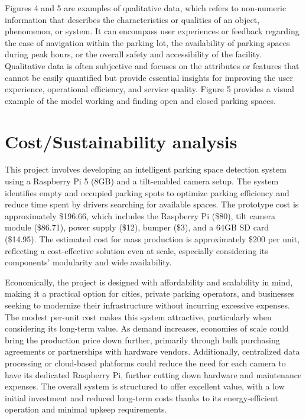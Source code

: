 \documentclass[conference]{IEEEtran}
\begin{document}
Figures 4 and 5 are examples of qualitative data, 
which refers to non-numeric information that describes the characteristics or qualities of an object, 
phenomenon, 
or system. 
It can encompass user experiences or feedback regarding the ease of navigation within the parking lot, 
the availability of parking spaces during peak hours, 
or the overall safety and accessibility of the facility. 
Qualitative data is often subjective and focuses on the attributes or features that cannot be easily quantified but provide essential insights for improving the user experience, 
operational efficiency, 
and service quality. 
Figure 5 provides a visual example of the model working and finding open and closed parking spaces.

\section{Cost/Sustainability analysis}

This project involves developing an intelligent parking space detection system using a Raspberry Pi 5 (8GB) and a tilt-enabled camera setup. The system identifies empty and occupied parking spots to optimize parking efficiency and reduce time spent by drivers searching for available spaces. The prototype cost is approximately \$196.66, which includes the Raspberry Pi (\$80), tilt camera module (\$86.71), power supply (\$12), bumper (\$3), and a 64GB SD card (\$14.95). The estimated cost for mass production is approximately \$200 per unit, reflecting a cost-effective solution even at scale, especially considering its components' modularity and wide availability.

Economically, the project is designed with affordability and scalability in mind, making it a practical option for cities, private parking operators, and businesses seeking to modernize their infrastructure without incurring excessive expenses. The modest per-unit cost makes this system attractive, particularly when considering its long-term value. As demand increases, economies of scale could bring the production price down further, primarily through bulk purchasing agreements or partnerships with hardware vendors. Additionally, centralized data processing or cloud-based platforms could reduce the need for each camera to have its dedicated Raspberry Pi, further cutting down hardware and maintenance expenses. The overall system is structured to offer excellent value, with a low initial investment and reduced long-term costs thanks to its energy-efficient operation and minimal upkeep requirements.
\end{document}
